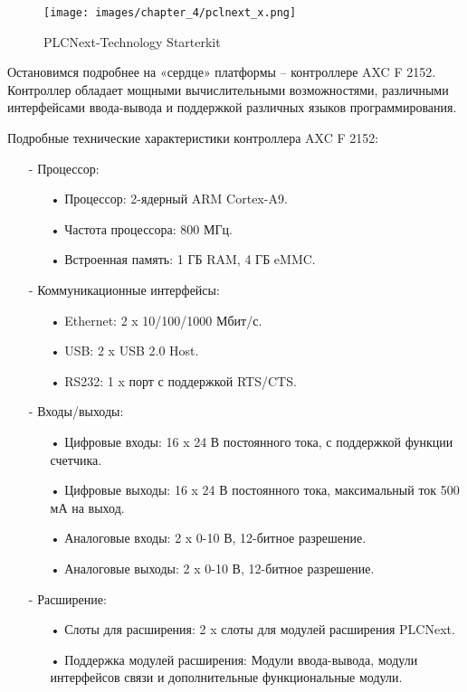 \begin{figure}[H]
    \centering
    \texttt{[image: images/chapter\_4/pclnext\_x.png]}
    \caption{PLCNext-Technology Starterkit}
    \label{fig:ACXF2152}
\end{figure}

Остановимся подробнее на «сердце» платформы {--} контроллере AXC F 2152. Контроллер обладает мощными вычислительными возможностями, различными интерфейсами ввода-вывода и поддержкой различных языков программирования.

Подробные технические характеристики контроллера AXC F 2152:

\begin{itemize}

    \item[-] Процессор:
        \begin{itemize}
            \item[•] Процессор: 2-ядерный ARM Cortex-A9.
            \item[•] Частота процессора: 800 МГц.
            \item[•] Встроенная память: 1 ГБ RAM, 4 ГБ eMMC.
        \end{itemize}

    \item[-] Коммуникационные интерфейсы:
        \begin{itemize}
            \item[•] Ethernet: 2 x 10/100/1000 Мбит/с.
            \item[•] USB: 2 x USB 2.0 Host.
            \item[•] RS232: 1 x порт с поддержкой RTS/CTS.
        \end{itemize}

    \item[-] Входы/выходы:
        \begin{itemize}
            \item[•] Цифровые входы: 16 x 24 В постоянного тока, с поддержкой функции счетчика.
            \item[•] Цифровые выходы: 16 x 24 В постоянного тока, максимальный ток 500 мА на выход.
            \item[•] Аналоговые входы: 2 x 0-10 В, 12-битное разрешение.
            \item[•] Аналоговые выходы: 2 x 0-10 В, 12-битное разрешение.
        \end{itemize}

    \item[-] Расширение:
        \begin{itemize}
            \item[•] Слоты для расширения: 2 x слоты для модулей расширения PLCNext.
            \item[•] Поддержка модулей расширения: Модули ввода-вывода, модули интерфейсов связи и дополнительные функциональные модули.
        \end{itemize}


\end{itemize}
